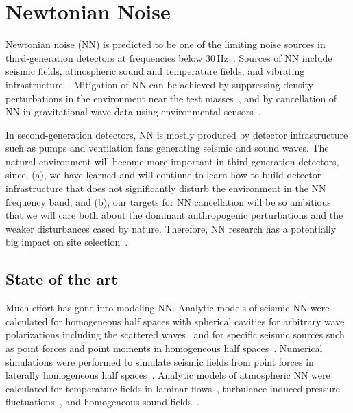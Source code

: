 
\chapter{Newtonian Noise}
\label{sec:Newtonian_Noise}

Newtonian noise (NN) is predicted to be one of the limiting noise sources in third-generation detectors at frequencies below 30\,Hz~\cite{Saulson:NN,Har2015}. Sources of NN include seismic fields, atmospheric sound and temperature fields, and vibrating infrastructure~\cite{HuTh1998,BeEA1998,Cre2008,FiEA2018,Har2015}. Mitigation of NN can be achieved by suppressing density perturbations in the environment near the test masses~\cite{HaHi2014}, and by cancellation of NN in gravitational-wave data using environmental sensors~\cite{Cel2000,CoEA2016a}.

\begin{samepage} %

In second-generation detectors, NN is mostly produced by detector infrastructure such as pumps and ventilation fans generating seismic and sound waves. The natural environment will become more important in third-generation detectors, since, (a), we have learned and will continue to learn how to build detector infrastructure that does not significantly disturb the environment in the NN frequency band, and (b), our targets for NN cancellation will be so ambitious that we will care both about the dominant anthropogenic perturbations and the weaker disturbances cased by nature. Therefore, NN research has a potentially big impact on site selection~\cite{BeEA2010}. 


\section{State of the art}
Much effort has gone into modeling NN. Analytic models of seismic NN were calculated for homogeneous half spaces with spherical cavities for arbitrary wave polarizations including the scattered waves~\cite{Har2015} and for specific seismic sources such as point forces and point moments in homogeneous half spaces~\cite{HaEA2015,Har2016}. Numerical simulations were performed to simulate seismic fields from point forces in laterally homogeneous half spaces~\cite{BeEA2010c}. Analytic models of atmospheric NN were calculated for temperature fields in laminar flows~\cite{Cre2008}, turbulence induced pressure fluctuations~\cite{Har2015}, and homogeneous sound fields~\cite{FiEA2018}. 

\end{samepage} %

